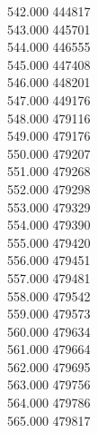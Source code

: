 { 542.000	444817 \\
 543.000	445701 \\
 544.000	446555 \\
 545.000	447408 \\
 546.000	448201 \\
 547.000	449176 \\
 548.000	479116 \\
 549.000	479176 \\
 550.000	479207 \\
 551.000	479268 \\
 552.000	479298 \\
 553.000	479329 \\
 554.000	479390 \\
 555.000	479420 \\
 556.000	479451 \\
 557.000	479481 \\
 558.000	479542 \\
 559.000	479573 \\
 560.000	479634 \\
 561.000	479664 \\
 562.000	479695 \\
 563.000	479756 \\
 564.000	479786 \\
 565.000	479817 \\
}
